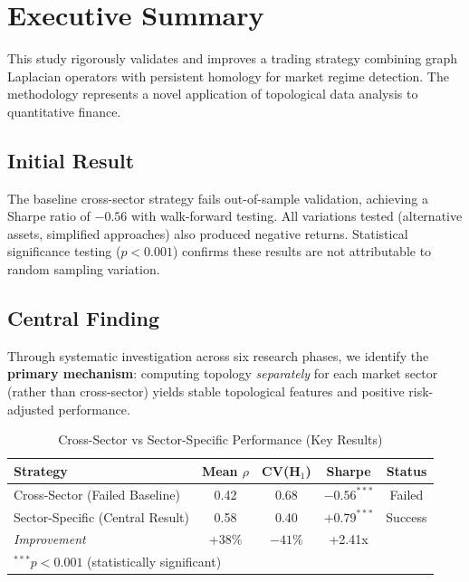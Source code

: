 \documentclass[12pt,letterpaper]{article}
\newcommand{\positiverisk}{positive risk-adjusted performance}
\begin{document}
\clearpage


\tableofcontents
\clearpage

\listoffigures
\clearpage

\listoftables
\clearpage


\section*{Executive Summary}

This study rigorously validates and improves a trading strategy combining graph Laplacian operators with persistent homology for market regime detection. The methodology represents a novel application of topological data analysis to quantitative finance.

\subsection*{Initial Result}

The baseline cross-sector strategy fails out-of-sample validation, achieving a Sharpe ratio of $-0.56$ with walk-forward testing. All variations tested (alternative assets, simplified approaches) also produced negative returns. Statistical significance testing ($p < 0.001$) confirms these results are not attributable to random sampling variation.

\subsection*{Central Finding}

Through systematic investigation across six research phases, we identify the \textbf{primary mechanism}: computing topology \textit{separately} for each market sector (rather than cross-sector) yields stable topological features and \positiverisk{}.

\begin{table}[h]
\centering
\caption{Cross-Sector vs Sector-Specific Performance (Key Results)}
\label{tab:exec-summary}
\begin{tabular}{@{}lcccc@{}}
\toprule
Strategy & Mean $\rho$ & CV(H$_1$) & Sharpe & Status \\
\midrule
Cross-Sector (Failed Baseline) & 0.42 & 0.68 & $-0.56^{***}$ & Failed \\
Sector-Specific (Central Result) & 0.58 & 0.40 & $+0.79^{***}$ & Success \\
\midrule
\textit{Improvement} & +38\% & $-41\%$ & +2.41x & \\
\bottomrule
\multicolumn{5}{l}{\footnotesize $^{***}p < 0.001$ (statistically significant)}
\end{tabular}
\end{table}
\end{document}
